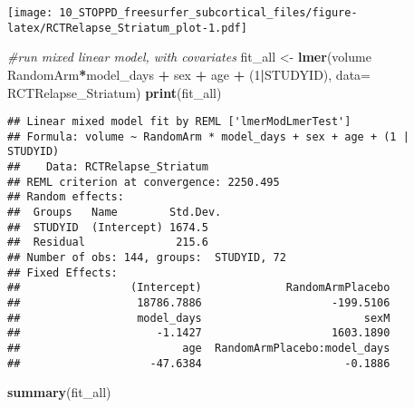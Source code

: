 \documentclass[]{article}
\newenvironment{Shaded}{\begin{snugshade}}{\end{snugshade}}
\newcommand{\KeywordTok}[1]{\textcolor[rgb]{0.13,0.29,0.53}{\textbf{#1}}}
\newcommand{\DataTypeTok}[1]{\textcolor[rgb]{0.13,0.29,0.53}{#1}}
\newcommand{\DecValTok}[1]{\textcolor[rgb]{0.00,0.00,0.81}{#1}}
\newcommand{\StringTok}[1]{\textcolor[rgb]{0.31,0.60,0.02}{#1}}
\newcommand{\CommentTok}[1]{\textcolor[rgb]{0.56,0.35,0.01}{\textit{#1}}}
\newcommand{\OperatorTok}[1]{\textcolor[rgb]{0.81,0.36,0.00}{\textbf{#1}}}
\newcommand{\NormalTok}[1]{#1}
\theoremstyle{definition}
\theoremstyle{definition}
\theoremstyle{definition}
\theoremstyle{remark}
\begin{document}
\texttt{[image: 10\_STOPPD\_freesurfer\_subcortical\_files/figure-latex/RCTRelapse\_Striatum\_plot-1.pdf]}

\begin{Shaded}
\begin{Highlighting}[]
\CommentTok{#run mixed linear model, with covariates}
\NormalTok{  fit_all <-}\StringTok{ }\KeywordTok{lmer}\NormalTok{(volume }\OperatorTok{~}\StringTok{ }\NormalTok{RandomArm}\OperatorTok{*}\NormalTok{model_days }\OperatorTok{+}\StringTok{ }\NormalTok{sex }\OperatorTok{+}\StringTok{ }\NormalTok{age }\OperatorTok{+}\StringTok{ }\NormalTok{(}\DecValTok{1}\OperatorTok{|}\NormalTok{STUDYID), }\DataTypeTok{data=}\NormalTok{ RCTRelapse_Striatum)}
  \KeywordTok{print}\NormalTok{(fit_all)}
\end{Highlighting}
\end{Shaded}

\begin{verbatim}
## Linear mixed model fit by REML ['lmerModLmerTest']
## Formula: volume ~ RandomArm * model_days + sex + age + (1 | STUDYID)
##    Data: RCTRelapse_Striatum
## REML criterion at convergence: 2250.495
## Random effects:
##  Groups   Name        Std.Dev.
##  STUDYID  (Intercept) 1674.5  
##  Residual              215.6  
## Number of obs: 144, groups:  STUDYID, 72
## Fixed Effects:
##                 (Intercept)             RandomArmPlacebo  
##                  18786.7886                    -199.5106  
##                  model_days                         sexM  
##                     -1.1427                    1603.1890  
##                         age  RandomArmPlacebo:model_days  
##                    -47.6384                      -0.1886
\end{verbatim}

\begin{Shaded}
\begin{Highlighting}[]
  \KeywordTok{summary}\NormalTok{(fit_all)}
\end{Highlighting}
\end{Shaded}
\end{document}
